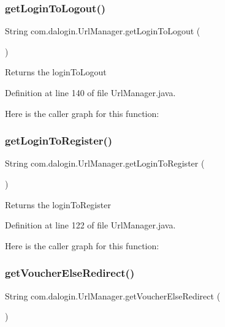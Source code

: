 \subsubsection{\texorpdfstring{get\+Login\+To\+Logout()}{getLoginToLogout()}}
{\footnotesize\ttfamily String com.\+dalogin.\+Url\+Manager.\+get\+Login\+To\+Logout (\begin{DoxyParamCaption}{ }\end{DoxyParamCaption})}

\begin{DoxyReturn}{Returns}
the login\+To\+Logout 
\end{DoxyReturn}


Definition at line 140 of file Url\+Manager.\+java.

Here is the caller graph for this function\+:
\mbox{\label{classcom_1_1dalogin_1_1_url_manager_a3b86c3b2a31e580e690e82bf3240d05b}} 
\subsubsection{\texorpdfstring{get\+Login\+To\+Register()}{getLoginToRegister()}}
{\footnotesize\ttfamily String com.\+dalogin.\+Url\+Manager.\+get\+Login\+To\+Register (\begin{DoxyParamCaption}{ }\end{DoxyParamCaption})}

\begin{DoxyReturn}{Returns}
the login\+To\+Register 
\end{DoxyReturn}


Definition at line 122 of file Url\+Manager.\+java.

Here is the caller graph for this function\+:
\mbox{\label{classcom_1_1dalogin_1_1_url_manager_a854c54fa3a3e289e2ded73bdb91e2c54}} 
\subsubsection{\texorpdfstring{get\+Voucher\+Else\+Redirect()}{getVoucherElseRedirect()}}
{\footnotesize\ttfamily String com.\+dalogin.\+Url\+Manager.\+get\+Voucher\+Else\+Redirect (\begin{DoxyParamCaption}{ }\end{DoxyParamCaption})}

